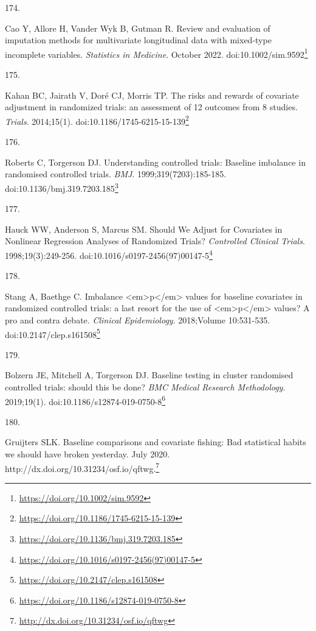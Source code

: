 \documentclass[
  a4paper,
]{book}
\newlength{\cslhangindent}
\newlength{\csllabelwidth}
\newlength{\cslentryspacingunit} %
\newenvironment{CSLReferences}[2] %
 {%
  \setlength{\parindent}{0pt}
  \ifodd #1
  \let\oldpar\par
  \def\par{\hangindent=\cslhangindent\oldpar}
  \fi
  \setlength{\parskip}{#2\cslentryspacingunit}
 }%
 {}
\newcommand{\CSLLeftMargin}[1]{\parbox[t]{\csllabelwidth}{#1}}
\newcommand{\CSLRightInline}[1]{\parbox[t]{\linewidth - \csllabelwidth}{#1}\break}
\renewcommand{\href}[2]{#2\footnote{\url{#1}}}
\begin{document}
\begin{CSLReferences}{0}{0}
\leavevmode{}%
\CSLLeftMargin{174. }%
\CSLRightInline{Cao Y, Allore H, Vander Wyk B, Gutman R. Review and evaluation of imputation methods for multivariate longitudinal data with mixed{-}type incomplete variables. \emph{Statistics in Medicine}. October 2022. doi:\href{https://doi.org/10.1002/sim.9592}{10.1002/sim.9592}}

\leavevmode{}%
\CSLLeftMargin{175. }%
\CSLRightInline{Kahan BC, Jairath V, Doré CJ, Morris TP. The risks and rewards of covariate adjustment in randomized trials: an assessment of 12 outcomes from 8 studies. \emph{Trials}. 2014;15(1). doi:\href{https://doi.org/10.1186/1745-6215-15-139}{10.1186/1745-6215-15-139}}

\leavevmode{}%
\CSLLeftMargin{176. }%
\CSLRightInline{Roberts C, Torgerson DJ. Understanding controlled trials: Baseline imbalance in randomised controlled trials. \emph{BMJ}. 1999;319(7203):185-185. doi:\href{https://doi.org/10.1136/bmj.319.7203.185}{10.1136/bmj.319.7203.185}}

\leavevmode{}%
\CSLLeftMargin{177. }%
\CSLRightInline{Hauck WW, Anderson S, Marcus SM. Should We Adjust for Covariates in Nonlinear Regression Analyses of Randomized Trials? \emph{Controlled Clinical Trials}. 1998;19(3):249-256. doi:\href{https://doi.org/10.1016/s0197-2456(97)00147-5}{10.1016/s0197-2456(97)00147-5}}

\leavevmode{}%
\CSLLeftMargin{178. }%
\CSLRightInline{Stang A, Baethge C. Imbalance \textless em\textgreater p\textless/em\textgreater{} values for baseline covariates in randomized controlled trials: a last resort for the use of \textless em\textgreater p\textless/em\textgreater{} values? A pro and contra debate. \emph{Clinical Epidemiology}. 2018;Volume 10:531-535. doi:\href{https://doi.org/10.2147/clep.s161508}{10.2147/clep.s161508}}

\leavevmode{}%
\CSLLeftMargin{179. }%
\CSLRightInline{Bolzern JE, Mitchell A, Torgerson DJ. Baseline testing in cluster randomised controlled trials: should this be done? \emph{BMC Medical Research Methodology}. 2019;19(1). doi:\href{https://doi.org/10.1186/s12874-019-0750-8}{10.1186/s12874-019-0750-8}}

\leavevmode{}%
\CSLLeftMargin{180. }%
\CSLRightInline{Gruijters SLK. Baseline comparisons and covariate fishing: Bad statistical habits we should have broken yesterday. July 2020. \href{http://dx.doi.org/10.31234/osf.io/qftwg}{http://dx.doi.org/10.31234/osf.io/qftwg.}}


\end{CSLReferences}
\end{document}
